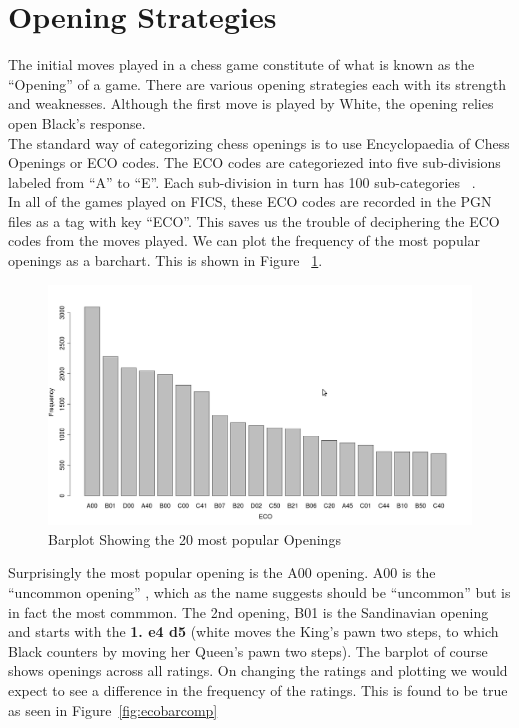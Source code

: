 \documentclass{article}
\begin{document}
\section{Opening Strategies}
The initial moves played in a chess game constitute of what is known as the ``Opening'' of a game. There are various opening strategies each with its strength and weaknesses. Although the first move is played by White, the opening relies open Black's response.\\

The standard way of categorizing chess openings is to use Encyclopaedia of Chess Openings or ECO codes. The ECO codes are categoriezed into five sub-divisions labeled from ``A'' to ``E''. Each sub-division in turn has 100 sub-categories ~\cite{wiki:eco}.\\

In all of the games played on FICS, these ECO codes are recorded in the PGN files as a tag with key ``ECO''. This saves us the trouble of deciphering the ECO codes from the moves played. We can plot the frequency of the most popular openings as a barchart. This is shown in Figure ~\ref{fig:ecobar}.

\begin{figure} [htp]
\begin{center}
\includegraphics[width=5in]{eco_bar.png}
\end{center}
\caption{Barplot Showing the 20 most popular Openings}
\label{fig:ecobar}
\end{figure}

Surprisingly the most popular opening is the A00 opening. A00 is the ``uncommon opening'' , which as the name suggests should be ``uncommon'' but is in fact the most commmon. The 2nd opening, B01 is the Sandinavian opening and starts with the {\bf 1. e4 d5} (white moves the King's pawn two steps, to which Black counters by moving her Queen's pawn two steps). The barplot of course shows openings across all ratings. On changing the ratings and plotting we would expect to see a difference in the frequency of the ratings. This is found to be true as seen in Figure~\ref{fig:ecobarcomp}
\end{document}
